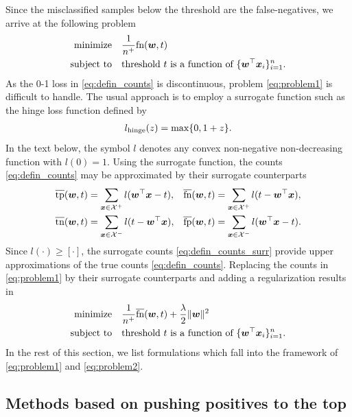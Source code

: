 \documentclass[]{interact}
\theoremstyle{plain}%
\theoremstyle{definition}
\theoremstyle{remark}
\let\originalleft\left
\let\originalright\right
\renewcommand{\left}{\mathopen{}\mathclose\bgroup\originalleft}
\renewcommand{\right}{\aftergroup\egroup\originalright}
\newcommand{\norm}[1]{\|#1\|}
\newcommand{\fn}{\textnormal{fn}}
\newcommand{\tps}{\overline{\textnormal{tp}}}
\newcommand{\tns}{\overline{\textnormal{tn}}}
\newcommand{\fps}{\overline{\textnormal{fp}}}
\newcommand{\fns}{\overline{\textnormal{fn}}}
\begin{document}
Since the misclassified samples below the threshold are the false-negatives, we arrive at the following problem
\begin{equation}\label{eq:problem1}
\aligned
{\rm minimize} & \quad\frac{1}{n^{+}}\fn(\bm w,t)\\
\textnormal{subject to} & \quad \text{threshold }t\text{ is a function of }\{\bm w^\top \bm x_i\}_{i=1}^n.
\endaligned
\end{equation}
As the 0-1 loss in \eqref{eq:defin_counts} is discontinuous, problem \eqref{eq:problem1} is difficult to handle. The usual approach is to employ a surrogate function such as the hinge loss function defined by
\begin{equation}\label{eq:defin_surrogate}
\aligned
l_{\rm hinge}\left(z\right) & =\max\left\{ 0,1+z\right\}. \\
\endaligned
\end{equation}
In the text below, the symbol $l$ denotes any convex non-negative non-decreasing function with $l(0)=1$. Using the surrogate function, the counts \eqref{eq:defin_counts} may be approximated by their surrogate counterparts
\begin{equation}\label{eq:defin_counts_surr}
\aligned
\tps(\bm w ,t) & = \sum_{\bm x\in\mathcal{X}^+}l(\bm w^\top \bm x-t), &
\fns(\bm w ,t) & = \sum_{\bm x\in\mathcal{X}^+}l(t-\bm w^\top \bm x), \\
\tns(\bm w ,t) & = \sum_{\bm x\in\mathcal{X}^-}l(t-\bm w^\top \bm x),&
\fps(\bm w ,t) & = \sum_{\bm x\in\mathcal{X}^-}l(\bm w^\top \bm x-t).
\endaligned
\end{equation}
Since $l(\cdot)\ge[\cdot]$, the surrogate counts \eqref{eq:defin_counts_surr} provide upper approximations of the true counts \eqref{eq:defin_counts}. Replacing the counts in \eqref{eq:problem1} by their surrogate counterparts and adding a regularization results in
\begin{equation}\label{eq:problem2}
\aligned
{\rm minimize} & \quad\frac{1}{n^{+}}\fns(\bm w,t) + \frac\lambda2\norm{\bm w}^2 \\
\textnormal{subject to} & \quad \text{threshold }t\text{ is a function of }\{\bm w^\top \bm x_i\}_{i=1}^n.
\endaligned
\end{equation}
In the rest of this section, we list formulations which fall into the framework of \eqref{eq:problem1} and \eqref{eq:problem2}.


\subsection{Methods based on pushing positives to the top}\label{sec:obj1}
\end{document}

